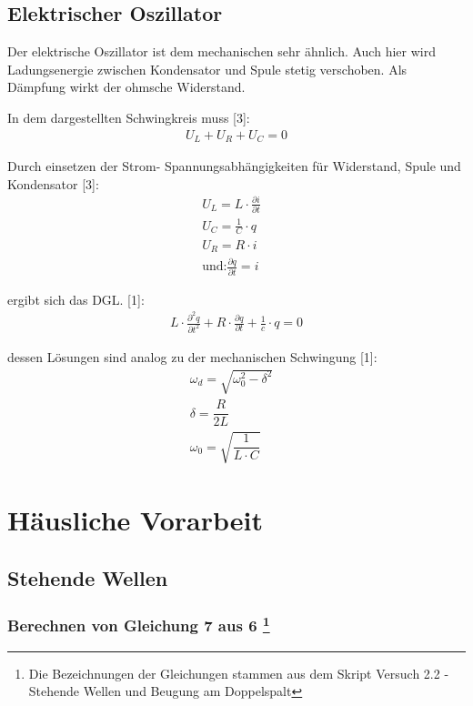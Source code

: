 \documentclass[a4paper]{scrartcl}
\numberwithin{equation}{subsection}
\begin{document}
\subsection{Elektrischer Oszillator}
Der elektrische Oszillator ist dem mechanischen sehr ähnlich. Auch hier wird Ladungsenergie zwischen Kondensator und Spule stetig verschoben. Als Dämpfung wirkt der ohmsche Widerstand. 

In dem dargestellten Schwingkreis muss [3]:
\begin{align}
U_L + U_R + U_C = 0
\end{align}

Durch einsetzen der Strom- Spannungsabhängigkeiten für Widerstand, Spule und Kondensator [3]:
\begin{align}
U_L = L \cdot \frac{\partial i}{\partial t} &\\
U_C = \frac{1}{C} \cdot q &\\
U_R = R \cdot i &\\
\text{und:} \frac{\partial q}{\partial t} = i &
\end{align}

ergibt sich das DGL. [1]:
\begin{align}
L \cdot \frac{\partial^2 q}{\partial t^2} + R \cdot \frac{\partial q}{\partial t} + \frac{1}{c} \cdot q = 0
\end{align}

dessen Lösungen sind analog zu der mechanischen Schwingung [1]:
\begin{align}
\omega_d = \sqrt{\omega_0^2 - \delta^2} &\\
\delta = \dfrac{R}{2L} &\\
\omega_0 = \sqrt{\dfrac{1}{L \cdot C}}
\end{align}

\newpage

\section{Häusliche Vorarbeit}
\subsection{Stehende Wellen}
\subsubsection[Berechnen von Gleichung 7 aus 6]{Berechnen von Gleichung 7 aus 6 \footnote{Die Bezeichnungen der Gleichungen stammen aus dem Skript \glqq Versuch 2.2 - Stehende Wellen und Beugung am Doppelspalt\grqq}}
\end{document}
